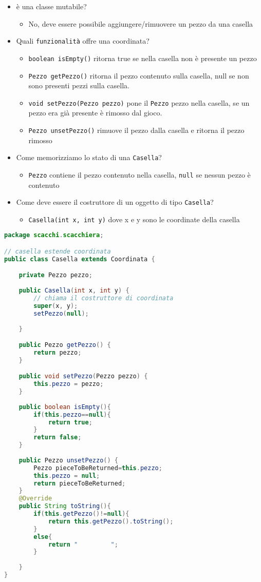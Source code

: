 \documentclass{article}
\begin{document}
\begin{itemize}
\item \`e una classe mutabile?
\begin{itemize}
\item No, deve essere possibile aggiungere/rimuovere un pezzo da una casella
\end{itemize}
\item Quali \texttt{funzionalit\`a} offre una coordinata? 
\begin{itemize}
\item \texttt{boolean isEmpty()} ritorna true se nella casella non \`e presente un pezzo
\item \texttt{Pezzo getPezzo()} ritorna il pezzo contenuto sulla casella, null se non sono presenti pezzi sulla casella.
\item \texttt{void setPezzo(Pezzo pezzo)} pone il \texttt{Pezzo} pezzo nella casella, se un pezzo era gi\`a presente \`e rimosso dal gioco.
\item \texttt{Pezzo unsetPezzo()} rimuove il pezzo dalla casella e ritorna il pezzo rimosso
\end{itemize}
\item Come memorizziamo lo stato di una \texttt{Casella}?
\begin{itemize}
\item \texttt{Pezzo} contiene il pezzo contenuto nella casella, \texttt{null} se nessun pezzo \`e contenuto
\end{itemize}
\item Come deve essere il costruttore di un oggetto di tipo \texttt{Casella}?
\begin{itemize}
\item \texttt{Casella(int x, int y)} dove x e y sono le coordinate della casella
\end{itemize}
\end{itemize}

\begin{lstlisting}[language=Java,escapechar=|]
package scacchi.scacchiera;

// casella estende coordinata
public class Casella extends Coordinata {

	private Pezzo pezzo;
	
	public Casella(int x, int y) {
		// chiama il costruttore di coordinata
		super(x, y);
		setPezzo(null);
		
	}

	public Pezzo getPezzo() {
		return pezzo;
	}

	public void setPezzo(Pezzo pezzo) {
		this.pezzo = pezzo;
	}
	
	public boolean isEmpty(){
		if(this.pezzo==null){
			return true;
		}
		return false;
	}
	
	public Pezzo unsetPezzo() {
		Pezzo pieceToBeReturned=this.pezzo;
		this.pezzo = null;
		return pieceToBeReturned;
	}
	@Override
	public String toString(){
		if(this.getPezzo()!=null){
			return this.getPezzo().toString();
		}
		else{
			return "         ";
		}
		
	}
}
\end{lstlisting}
\end{document}
